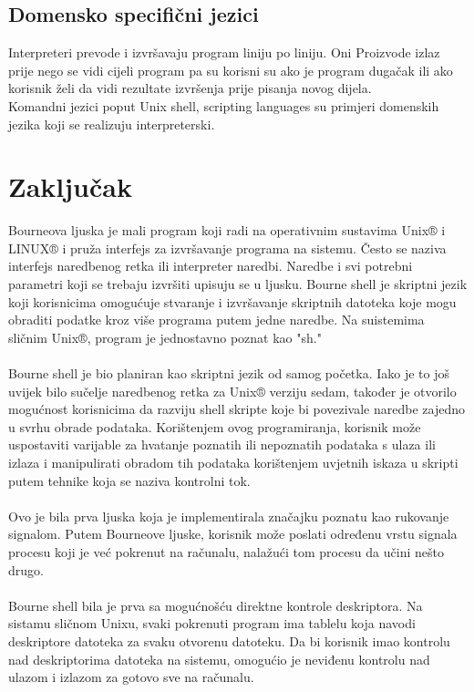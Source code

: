 \documentclass[11pt]{book}
\begin{document}
\subsection{Domensko specifični jezici}
Interpreteri prevode i izvršavaju program liniju po liniju. Oni Proizvode izlaz prije nego se vidi cijeli program pa su korisni su ako je program dugačak ili ako korisnik želi da vidi rezultate izvršenja prije pisanja novog dijela.\\ 
Komandni jezici poput Unix shell, scripting languages su primjeri domenskih jezika koji se realizuju interpreterski.

\section{Zaključak}
Bourneova ljuska je mali program koji radi na operativnim sustavima Unix® i LINUX® i pruža interfejs za izvršavanje programa na sistemu. Često se naziva interfejs naredbenog retka ili interpreter naredbi. Naredbe i svi potrebni parametri koji se trebaju izvršiti upisuju se u ljusku. Bourne shell je skriptni jezik koji korisnicima omogućuje stvaranje i izvršavanje skriptnih datoteka koje mogu obraditi podatke kroz više programa putem jedne naredbe. Na suistemima sličnim Unix®, program je jednostavno poznat kao "sh."\\\\
Bourne shell je bio planiran kao skriptni jezik od samog početka. Iako je to još uvijek bilo sučelje naredbenog retka za Unix® verziju sedam, također je otvorilo mogućnost korisnicima da razviju shell skripte koje bi povezivale naredbe zajedno u svrhu obrade podataka. Korištenjem ovog programiranja, korisnik može uspostaviti varijable za hvatanje poznatih ili nepoznatih podataka s ulaza ili izlaza i manipulirati obradom tih podataka korištenjem uvjetnih iskaza u skripti putem tehnike koja se naziva kontrolni tok.\\\\
Ovo je bila prva ljuska koja je implementirala značajku poznatu kao rukovanje signalom. Putem Bourneove ljuske, korisnik može poslati određenu vrstu signala procesu koji je već pokrenut na računalu, nalažući tom procesu da učini nešto drugo.\\\\
Bourne shell bila je prva sa mogućnošću direktne kontrole deskriptora. Na sistamu sličnom Unixu, svaki pokrenuti program ima tablelu koja navodi deskriptore datoteka za svaku otvorenu datoteku. Da bi korisnik imao kontrolu nad deskriptorima datoteka na sistemu, omogućio je neviđenu kontrolu nad ulazom i izlazom za gotovo sve na računalu.\\\\
\end{document}
